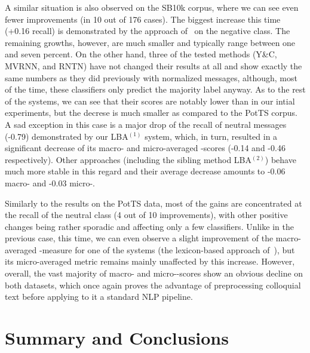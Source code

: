 A similar situation is also observed on the SB10k corpus, where we can
see even fewer improvements (in 10 out of 176 cases).  The biggest
increase this time (+0.16 recall) is demonstrated by the approach
of~\citet{Baziotis:17} on the negative class.  The remaining growths,
however, are much smaller and typically range between one and seven
percent.  On the other hand, three of the tested methods (Y\&C, MVRNN,
and RNTN) have not changed their results at all and show exactly the
same numbers as they did previously with normalized messages,
although, most of the time, these classifiers only predict the
majority label anyway.  As to the rest of the systems, we can see that
their scores are notably lower than in our intial experiments, but the
decrese is much smaller as compared to the PotTS corpus.  A sad
exception in this case is a major drop of the recall of neutral
messages (-0.79) demonstrated by our LBA$^{(1)}$ system, which, in
turn, resulted in a significant decrease of its macro- and
micro-averaged \F{}-scores (-0.14 and -0.46 respectively).  Other
approaches (including the sibling method LBA$^{(2)}$) behave much more
stable in this regard and their average decrease amounts to -0.06
macro- and -0.03 micro-\F{}.

Similarly to the results on the PotTS data, most of the gains are
concentrated at the recall of the neutral class (4 out of 10
improvements), with other positive changes being rather sporadic and
affecting only a few classifiers.  Unlike in the previous case, this
time, we can even observe a slight improvement of the macro-averaged
\F-measure for one of the systems (the lexicon-based approach
of~\citeauthor{Jurek:15}), but its micro-averaged metric remains
mainly unaffected by this increase.  However, overall, the vast
majority of macro- and micro-\F-scores show an obvious decline on both
datasets, which once again proves the advantage of preprocessing
colloquial text before applying to it a standard NLP pipeline.


\section{Summary and Conclusions}\label{slsa:subsec:conclusions}

